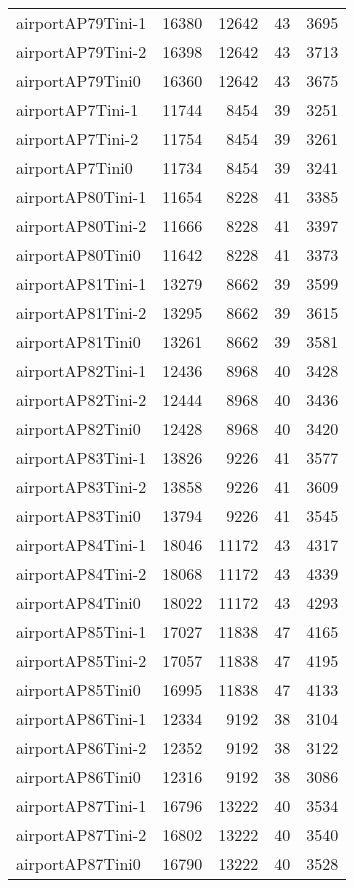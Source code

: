 \begin{longtable}{lrrrr}
airportAP79Tini-1 & 16380 & 12642 & 43 & 3695 \\
airportAP79Tini-2 & 16398 & 12642 & 43 & 3713 \\
airportAP79Tini0 & 16360 & 12642 & 43 & 3675 \\
airportAP7Tini-1 & 11744 & 8454 & 39 & 3251 \\
airportAP7Tini-2 & 11754 & 8454 & 39 & 3261 \\
airportAP7Tini0 & 11734 & 8454 & 39 & 3241 \\
airportAP80Tini-1 & 11654 & 8228 & 41 & 3385 \\
airportAP80Tini-2 & 11666 & 8228 & 41 & 3397 \\
airportAP80Tini0 & 11642 & 8228 & 41 & 3373 \\
airportAP81Tini-1 & 13279 & 8662 & 39 & 3599 \\
airportAP81Tini-2 & 13295 & 8662 & 39 & 3615 \\
airportAP81Tini0 & 13261 & 8662 & 39 & 3581 \\
airportAP82Tini-1 & 12436 & 8968 & 40 & 3428 \\
airportAP82Tini-2 & 12444 & 8968 & 40 & 3436 \\
airportAP82Tini0 & 12428 & 8968 & 40 & 3420 \\
airportAP83Tini-1 & 13826 & 9226 & 41 & 3577 \\
airportAP83Tini-2 & 13858 & 9226 & 41 & 3609 \\
airportAP83Tini0 & 13794 & 9226 & 41 & 3545 \\
airportAP84Tini-1 & 18046 & 11172 & 43 & 4317 \\
airportAP84Tini-2 & 18068 & 11172 & 43 & 4339 \\
airportAP84Tini0 & 18022 & 11172 & 43 & 4293 \\
airportAP85Tini-1 & 17027 & 11838 & 47 & 4165 \\
airportAP85Tini-2 & 17057 & 11838 & 47 & 4195 \\
airportAP85Tini0 & 16995 & 11838 & 47 & 4133 \\
airportAP86Tini-1 & 12334 & 9192 & 38 & 3104 \\
airportAP86Tini-2 & 12352 & 9192 & 38 & 3122 \\
airportAP86Tini0 & 12316 & 9192 & 38 & 3086 \\
airportAP87Tini-1 & 16796 & 13222 & 40 & 3534 \\
airportAP87Tini-2 & 16802 & 13222 & 40 & 3540 \\
airportAP87Tini0 & 16790 & 13222 & 40 & 3528 \\

\end{longtable}
